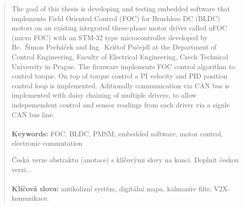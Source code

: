 \begin{abstract}
{
The goal of this thesis is developing and testing embedded software that implements Field Oriented Control
(FOC) for Brushless DC (BLDC) motors on an existing integrated three-phase motor driver called uFOC (micro FOC) with an STM-32
type microcontroller developed by Bc.~Šimon Pecháček and Ing.~Krištof Pučejdl at the Department of Control Engineering, Faculty of Electrical Engineering, Czech Technical University in Prague.
The firmware implements FOC control algorithm to control torque. On top of torque control a PI velocity and PID position control loop is implemented. 
Aditionally communication via CAN bus is implemented with daisy chaining of multiple drivers, to allow indepemendent control and sensor readings from each driver via a signle CAN bus line.
\\
\\
\textbf{Keywords:} FOC, BLDC, PMSM, embedded software, motor control, electronic commutation
}


{
Česká verze abstraktu (anotace) s klíčovými slovy na konci.
Doplnit českou verzi...
\\
\\
\textbf{Klíčová slova:} antikolizní systém, digitální mapa, kalmanův filtr, V2X-komunikace.
}
\end{abstract}